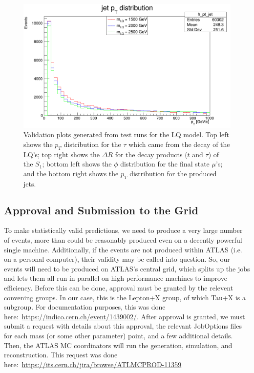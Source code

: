 \begin{figure}[ht]
            \includegraphics[scale=0.2]{res/ValidationPlots/h_pt_jet.png}

            \caption{Validation plots generated from test runs for the LQ model. Top left shows the $p_T$ distribution for the $\tau$ which came from the decay of the LQ's; top right shows the $\Delta R$ for the decay products ($t$ and $\tau$) of the $S_1$; bottom left shows the $\phi$ distribution for the final state $\mu$'s; and the bottom right shows the $p_T$ distribution for the produced jets.}
            \label{validationPlots}
        \end{figure}

    \subsection{Approval and Submission to the Grid}
        To make statistically valid predictions, we need to produce a very large number of events, more than could be reasonably produced even on a decently powerful single machine. Additionally, if the events are not produced within ATLAS (i.e. on a personal computer), their validity may be called into question. So, our events will need to be produced on ATLAS's central grid, which splits up the jobs and lets them all run in parallel on high-performance machines to improve efficiency. Before this can be done, approval must be granted by the relevent convening groups. In our case, this is the Lepton+X group, of which Tau+X is a subgroup. For documentation purposes, this was done here:~\url{https://indico.cern.ch/event/1439002/}. After approval is granted, we must submit a request with details about this approval, the relevant JobOptions files for each mass (or some other parameter) point, and a few additional details. Then, the ATLAS MC coordinators will run the generation, simulation, and reconstruction. This request was done here:~\url{https://its.cern.ch/jira/browse/ATLMCPROD-11359}

        
